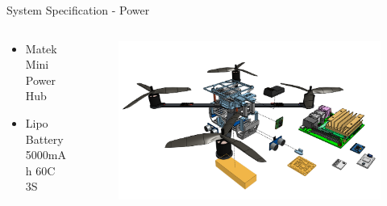 \begin{frame}{System Specification - Power}


    \begin{columns}
        \begin{column}{0.4\textwidth}
        \begin{itemize}
            \item Matek Mini Power Hub
            \item Lipo Battery 5000mAh 60C 3S
        \end{itemize}
        \end{column}
        \begin{column}{0.6\textwidth}  %
            \begin{figure}
                \centering
                \includegraphics[width=1\textwidth]{img/exploded-power.png}
                \label{fig:power}
            \end{figure}
        \end{column}
    \end{columns}
\end{frame}

